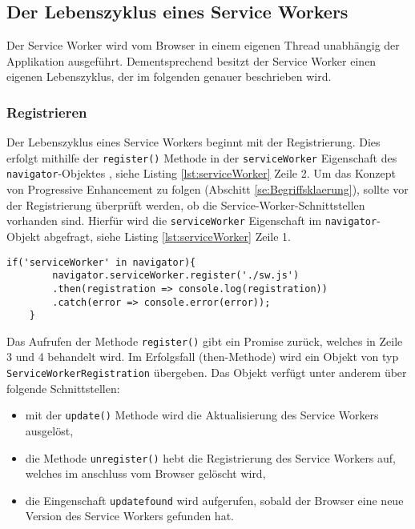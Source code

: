 \subsection{Der Lebenszyklus eines Service Workers}

 
Der Service Worker wird vom Browser in einem eigenen Thread unabhängig der Applikation ausgeführt. Dementsprechend besitzt der Service Worker einen eigenen Lebenszyklus, der im folgenden genauer beschrieben wird. 

\subsubsection{Registrieren}
Der Lebenszyklus eines Service Workers beginnt mit der Registrierung. Dies erfolgt mithilfe der \texttt{register()} Methode in der \texttt{serviceWorker} Eigenschaft des \texttt{navigator}-Objektes \cite{Navigator2022}, siehe Listing \ref{lst:serviceWorker} Zeile 2. Um das Konzept von Progressive Enhancement zu folgen (Abschitt \ref{se:Begriffsklaerung}), sollte vor der Registrierung überprüft werden, ob die Service-Worker-Schnittstellen vorhanden sind. Hierfür wird die \texttt{serviceWorker} Eigenschaft im \texttt{navigator}-Objekt abgefragt, siehe Listing \ref{lst:serviceWorker} Zeile 1. 

\begin{lstlisting}[caption = Registrierung des Service Workers, label = lst:serviceWorker, float = !htb]
    if('serviceWorker' in navigator){
        navigator.serviceWorker.register('./sw.js')
        .then(registration => console.log(registration))
        .catch(error => console.error(error));
    }
\end{lstlisting}

Das Aufrufen der Methode \texttt{register()} gibt ein Promise zurück, welches in Zeile 3 und 4 behandelt wird. 
Im Erfolgsfall (then-Methode) wird ein Objekt von typ \texttt{ServiceWorkerRegistration} übergeben. Das Objekt verfügt unter anderem über folgende Schnittstellen: 
\begin{itemize}
    \item mit der \texttt{update()} Methode wird die Aktualisierung des Service Workers ausgelöst,
    \item die Methode \texttt{unregister()} hebt die Registrierung des Service Workers auf, welches im anschluss vom Browser gelöscht wird,
    \item die Eingenschaft \texttt{updatefound} wird aufgerufen, sobald der Browser eine neue Version des Service Workers gefunden hat. 
\end{itemize}


